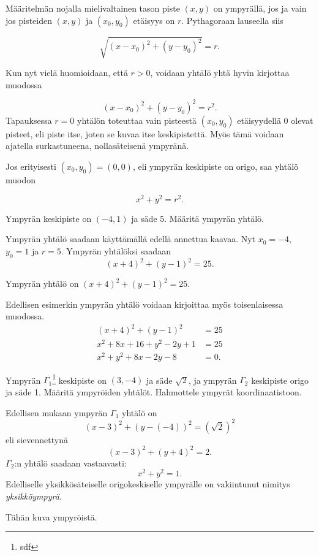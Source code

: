 Määritelmän nojalla mielivaltainen tason piste $(x,y)$ on ympyrällä, jos ja vain jos pisteiden $(x,y)$ ja $(x_{0},y_{0})$ etäisyys on $r$. Pythagoraan lauseella siis

\[
\sqrt{(x-x_{0})^{2}+(y-y_{0})^{2}} = r.
\]

Kun nyt vielä huomioidaan, että $r > 0$, voidaan yhtälö yhtä hyvin kirjottaa muodossa

\[
(x-x_{0})^{2}+(y-y_{0})^{2} = r^{2}.
\]
Tapauksessa $r=0$ yhtälön toteuttaa vain pisteestä $(x_{0},y_{0})$ etäisyydellä 0 olevat pisteet, eli piste itse, joten se kuvaa itse keskipistettä. Myös tämä voidaan ajatella surkastuneena, nollasäteisenä ympyränä.

Jos erityisesti $(x_{0},y_{0})= (0,0)$, eli ympyrän keskipiste on origo, saa yhtälö muodon

\[
x^{2}+y^{2} = r^{2}.
\]


\begin{esimerkki}
Ympyrän keskipiste on $(-4,1)$ ja säde $5$. Määritä ympyrän yhtälö.
\begin{esimratk}
Ympyrän yhtälö saadaan käyttämällä edellä annettua kaavaa. Nyt $x_0=-4$, $y_0=1$ ja $r=5$. Ympyrän yhtälöksi saadaan
\[
(x+4)^2+(y-1)^2=25.
\]
\end{esimratk}
\begin{esimvast}
Ympyrän yhtälö on $(x+4)^2+(y-1)^2=25$.
\end{esimvast}
\end{esimerkki}

Edellisen esimerkin ympyrän yhtälö voidaan kirjoittaa myös toisenlaisessa muodossa.
\begin{align*}
(x+4)^2+(y-1)^2&=25 \\
x^2+8x+16+y^2-2y+1&=25 \\
x^2+y^2+8x-2y-8&=0.
\end{align*}

\begin{esimerkki}
Ympyrän $\Gamma_{1}$\footnote{sdf} keskipiste on $(3,-4)$ ja säde $\sqrt{2}$, ja ympyrän $\Gamma_{2}$ keskipiste origo ja säde 1. Määritä ympyröiden yhtälöt. Hahmottele ympyrät koordinaatistoon.

\begin{esimratk}
Edellisen mukaan ympyrän $\Gamma_{1}$ yhtälö on
\[
(x-3)^{2}+(y-(-4))^{2} = (\sqrt{2})^{2}
\]
eli sievennettynä
\[
(x-3)^{2}+(y+4)^{2} = 2.
\]
$\Gamma_{2}$:n yhtälö saadaan vastaavasti:
\[
x^{2}+y^{2} = 1.
\]
Edelliselle yksikkösäteiselle origokeskiselle ympyrälle on vakiintunut nimitys \emph{yksikköympyrä}.

Tähän kuva ympyröistä.

\end{esimratk}
\end{esimerkki}

